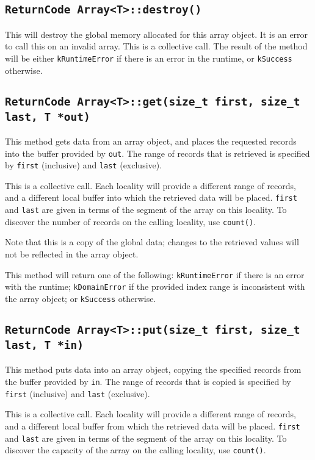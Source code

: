 \subsection{{\tt ReturnCode Array<T>::destroy()}}

This will destroy the global memory allocated for this array object. It is
an error to call this on an invalid array. This is a collective call. The
result of the method will be either {\tt kRuntimeError} if there is an error
in the runtime, or {\tt kSuccess} otherwise.

\subsection{{\tt ReturnCode Array<T>::get(size\_t first, size\_t last, T *out)}}
This method gets data from an array object, and places the requested
records into the buffer provided by {\tt out}. The range of records that is
retrieved is specified by {\tt first} (inclusive) and {\tt last} (exclusive).

This is a collective call. Each locality will provide a different range of
records, and a different local buffer into which the retrieved data will be
placed. {\tt first} and {\tt last} are given in terms of the segment of the
array on this locality. To discover the number of records on the calling
locality, use {\tt count()}.

Note that this is a copy of the global data; changes to the retrieved values
will not be reflected in the array object.

This method will return one of the following: {\tt kRuntimeError} if there is an
error with the runtime; {\tt kDomainError} if the provided index range is
inconsistent with the array object; or {\tt kSuccess} otherwise.

\subsection{{\tt ReturnCode Array<T>::put(size\_t first, size\_t last, T *in)}}

This method puts data into an array object, copying the specified
records from the buffer provided by {\tt in}. The range of records that is
copied is specified by {\tt first} (inclusive) and {\tt last} (exclusive).

This is a collective call. Each locality will provide a different range of
records, and a different local buffer from which the retrieved data will be
placed. {\tt first} and {\tt last} are given in terms of the segment of the
array on this locality. To discover the capacity of the array on the calling
locality, use {\tt count()}.

